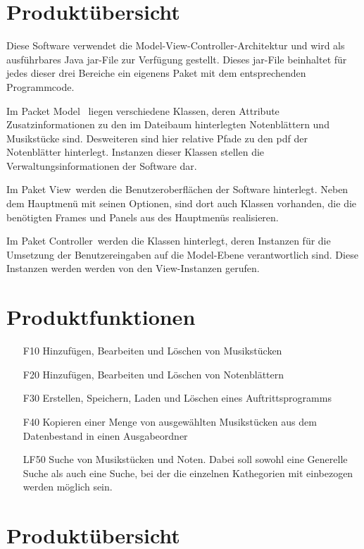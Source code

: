 \documentclass[10pt]{scrartcl}
\begin{document}
\section{Produktübersicht}
Diese Software verwendet die Model-View-Controller-Architektur und wird als ausführbares Java jar-File zur Verfügung gestellt. Dieses jar-File beinhaltet für jedes dieser drei Bereiche ein eigenens Paket mit dem entsprechenden Programmcode. 

Im Packet \glqq Model\grqq~ liegen verschiedene Klassen, deren Attribute Zusatzinformationen zu den im Dateibaum hinterlegten Notenblättern und Musikstücke sind. Desweiteren sind hier relative Pfade zu den pdf der Notenblätter hinterlegt. Instanzen dieser Klassen stellen die Verwaltungsinformationen der Software dar.

Im Paket \glqq View\grqq~werden die Benutzeroberflächen der Software hinterlegt. Neben dem Hauptmenü mit seinen Optionen, sind dort auch Klassen vorhanden, die die benötigten Frames und Panels aus des Hauptmenüs realisieren.

Im Paket \glqq Controller\grqq~werden die Klassen hinterlegt, deren Instanzen für die Umsetzung der Benutzereingaben auf die Model-Ebene verantwortlich sind. Diese Instanzen werden werden von den View-Instanzen gerufen. 

\section{Produktfunktionen}
\begin{enumerate}
\item[F10] Hinzufügen, Bearbeiten und Löschen von Musikstücken
\item[F20] Hinzufügen, Bearbeiten und Löschen von Notenblättern
\item[F30] Erstellen, Speichern, Laden und Löschen eines Auftrittsprogramms
\item[F40] Kopieren einer Menge von ausgewählten Musikstücken aus dem Datenbestand in einen Ausgabeordner
\item[LF50] Suche von Musikstücken und Noten. Dabei soll sowohl eine Generelle Suche als auch eine Suche, bei der die einzelnen Kathegorien mit einbezogen werden möglich sein.
\end{enumerate}
\section{Produktübersicht}
\end{document}
